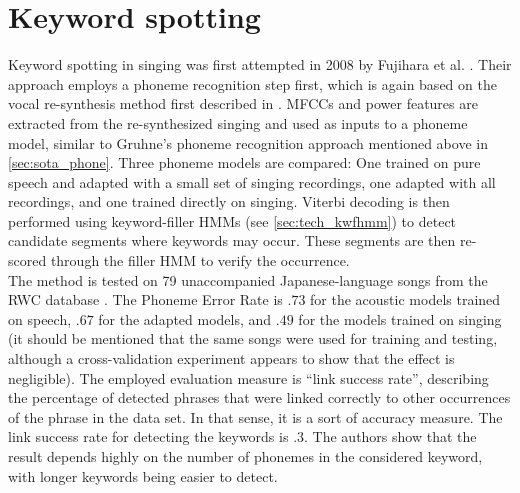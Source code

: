 \section{Keyword spotting}
Keyword spotting in singing was first attempted in 2008 by Fujihara et al. \cite{hyperlinking_lyrics}. Their approach employs a phoneme recognition step first, which is again based on the vocal re-synthesis method first described in \cite{fujihara_identification}. MFCCs and power features are extracted from the re-synthesized singing and used as inputs to a phoneme model, similar to Gruhne's phoneme recognition approach mentioned above in \ref{sec:sota_phone}.  Three phoneme models are compared: One trained on pure speech and adapted with a small set of singing recordings, one adapted with all recordings, and one trained directly on singing. Viterbi decoding is then performed using keyword-filler HMMs (see \ref{sec:tech_kwfhmm}) to detect candidate segments where keywords may occur. These segments are then re-scored through the filler HMM to verify the occurrence.\\
The method is tested on 79 unaccompanied Japanese-language songs from the RWC database \cite{rwc}. The Phoneme Error Rate is $.73$ for the acoustic models trained on speech, $.67$ for the adapted models, and $.49$ for the models trained on singing (it should be mentioned that the same songs were used for training and testing, although a cross-validation experiment appears to show that the effect is negligible). The employed evaluation measure is ``link success rate'', describing the percentage of detected phrases that were linked correctly to other occurrences of the phrase in the data set. In that sense, it is a sort of accuracy measure. The link success rate for detecting the keywords is $.3$. The authors show that the result depends highly on the number of phonemes in the considered keyword, with longer keywords being easier to detect.\\
